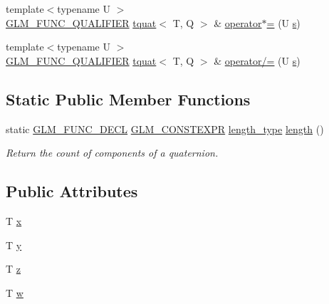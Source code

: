 \begin{DoxyCompactItemize}
\item 
{\footnotesize template$<$typename U $>$ }\\\mbox{\hyperlink{setup_8hpp_a33fdea6f91c5f834105f7415e2a64407}{G\+L\+M\+\_\+\+F\+U\+N\+C\+\_\+\+Q\+U\+A\+L\+I\+F\+I\+ER}} \mbox{\hyperlink{structglm_1_1tquat}{tquat}}$<$ T, Q $>$ \& \mbox{\hyperlink{structglm_1_1tquat_a753a68a2bea0f6504d982404c6824e38}{operator$\ast$=}} (U \mbox{\hyperlink{_s_d_l__opengl_8h_a4af680a6c683f88ed67b76f207f2e6e4}{s}})
\item 
{\footnotesize template$<$typename U $>$ }\\\mbox{\hyperlink{setup_8hpp_a33fdea6f91c5f834105f7415e2a64407}{G\+L\+M\+\_\+\+F\+U\+N\+C\+\_\+\+Q\+U\+A\+L\+I\+F\+I\+ER}} \mbox{\hyperlink{structglm_1_1tquat}{tquat}}$<$ T, Q $>$ \& \mbox{\hyperlink{structglm_1_1tquat_a08d66426ba503daea896ae95eb666299}{operator/=}} (U \mbox{\hyperlink{_s_d_l__opengl_8h_a4af680a6c683f88ed67b76f207f2e6e4}{s}})
\end{DoxyCompactItemize}
\subsection*{Static Public Member Functions}
\begin{DoxyCompactItemize}
\item 
static \mbox{\hyperlink{setup_8hpp_ab2d052de21a70539923e9bcbf6e83a51}{G\+L\+M\+\_\+\+F\+U\+N\+C\+\_\+\+D\+E\+CL}} \mbox{\hyperlink{setup_8hpp_a08b807947b47031d3a511f03f89645ad}{G\+L\+M\+\_\+\+C\+O\+N\+S\+T\+E\+X\+PR}} \mbox{\hyperlink{structglm_1_1tquat_a6d9ab28781d7835b30216a996484c026}{length\+\_\+type}} \mbox{\hyperlink{structglm_1_1tquat_a7cf19acd1bf11bdf0f52dbc16b3dee53}{length}} ()
\begin{DoxyCompactList}\small\item\em Return the count of components of a quaternion. \end{DoxyCompactList}\end{DoxyCompactItemize}
\subsection*{Public Attributes}
\begin{DoxyCompactItemize}
\item 
T \mbox{\hyperlink{structglm_1_1tquat_a74fac4f3deda35413106feeae734641c}{x}}
\item 
T \mbox{\hyperlink{structglm_1_1tquat_a09c876d49b2406fd50aca892f3637f0f}{y}}
\item 
T \mbox{\hyperlink{structglm_1_1tquat_a81cfe33795e56627715972ad533605d4}{z}}
\item 
T \mbox{\hyperlink{structglm_1_1tquat_a7e71715c0eb0b1cd8de24fc5012594bf}{w}}
\end{DoxyCompactItemize}



